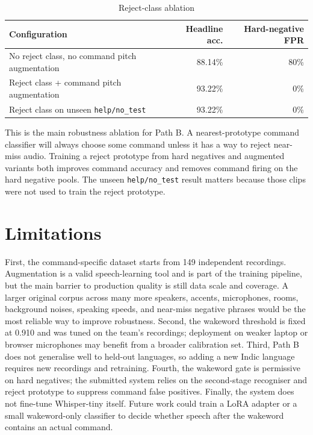 \documentclass[11pt]{article}
\begin{document}
\begin{table}[h]
\centering
\caption{Reject-class ablation}
\begin{tabular}{lrr}
\toprule
Configuration & Headline acc. & Hard-negative FPR \\
\midrule
No reject class, no command pitch augmentation & 88.14\% & 80\% \\
Reject class + command pitch augmentation & 93.22\% & 0\% \\
Reject class on unseen \texttt{help/no\_test} & 93.22\% & 0\% \\
\bottomrule
\end{tabular}
\end{table}

This is the main robustness ablation for Path B. A nearest-prototype command
classifier will always choose some command unless it has a way to reject
near-miss audio. Training a reject prototype from hard negatives and augmented
variants both improves command accuracy and removes command firing on the hard
negative pools. The unseen \texttt{help/no\_test} result matters because those
clips were not used to train the reject prototype.

\section{Limitations}

First, the command-specific dataset starts from 149 independent recordings.
Augmentation is a valid speech-learning tool and is part of the training
pipeline, but the main barrier to production quality is still data scale and
coverage. A larger original corpus across many more speakers, accents,
microphones, rooms, background noises, speaking speeds, and near-miss negative
phrases would be the most reliable way to improve robustness. Second, the
wakeword threshold is fixed at 0.910 and was tuned on the team's recordings;
deployment on weaker laptop or browser microphones may benefit from a broader
calibration set. Third, Path B does not generalise well to held-out languages,
so adding a new Indic language requires new recordings and retraining. Fourth,
the wakeword gate is permissive on hard negatives; the submitted system relies
on the second-stage recogniser and reject prototype to suppress command false
positives. Finally, the system does not fine-tune Whisper-tiny itself. Future
work could train a LoRA adapter or a small wakeword-only classifier to decide
whether speech after the wakeword contains an actual command.
\end{document}
